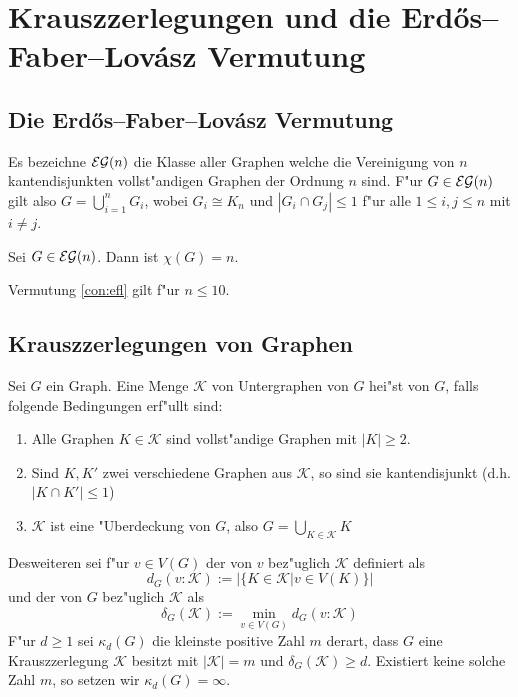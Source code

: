 \section{Krauszzerlegungen und die Erd\H{o}s--Faber--Lov\'asz Vermutung}
\subsection{Die Erd\H{o}s--Faber--Lov\'asz Vermutung}
\label{sec:EFL-Vermutung}
Es bezeichne ${\cal EG}(n)$ die Klasse aller Graphen welche die Vereinigung von $n$ kantendisjunkten vollst"andigen Graphen der Ordnung $n$ sind. F"ur $G\in{\cal EG}(n)$ gilt also $G= \bigcup\limits_{i=1}^{n} G_i$, wobei $G_i \cong K_n$ und $|G_i \cap G_j| \leq 1$ f"ur alle $1\leq i,j \leq n$ mit $i\neq j$. 
\begin{conjecture}
  Sei $G\in{\cal EG}(n)$. Dann ist $\chi(G) = n$.
  \label{con:efl}
\end{conjecture}

\begin{remark}
 Vermutung \ref{con:efl} gilt f"ur $n\leq 10$.
\end{remark}
\subsection{Krauszzerlegungen von Graphen}
\label{ssec:Krauszzerlegung}
\begin{definition}
  \label{def:Krauszzerlegung}
  Sei $G$ ein Graph. Eine Menge $\mathcal K$ von Untergraphen von $G$ hei"st  von $G$, falls folgende Bedingungen erf"ullt sind:
  \begin{enumerate}[label={\rm(K\alph*)}]
    \item Alle Graphen $K\in \mathcal{K}$ sind vollst"andige Graphen mit $|K| \geq 2$.
    \item Sind $K,K'$ zwei verschiedene Graphen aus $\mathcal{K}$, so sind sie kantendisjunkt (d.h. $|K\cap K'| \leq 1$)
    \item $\mathcal K$ ist eine "Uberdeckung von $G$, also  $G=\bigcup\limits_{K\in \mathcal K}K$
  \end{enumerate}
  Desweiteren sei f"ur $v\in V(G)$ der  von $v$ bez"uglich $\mathcal K$ definiert als $$d_G(v:\mathcal K) := |\{ K\in\mathcal K| v \in V(K)\}|$$ und der  von $G$ bez"uglich $\mathcal K$ als $$\delta_G(\mathcal K) := \min\limits_{v\in V(G)}d_G(v:\mathcal K)$$ 
  F"ur $d \geq 1$ sei $\kappa_d(G)$ die kleinste positive Zahl $m$ derart, dass $G$ eine Krauszzerlegung $\mathcal K$ besitzt mit $|\mathcal K| = m$ und $\delta_G(\mathcal K) \geq d$. Existiert keine solche Zahl $m$, so setzen wir $\kappa_{d}(G) = \infty$.
\end{definition}

